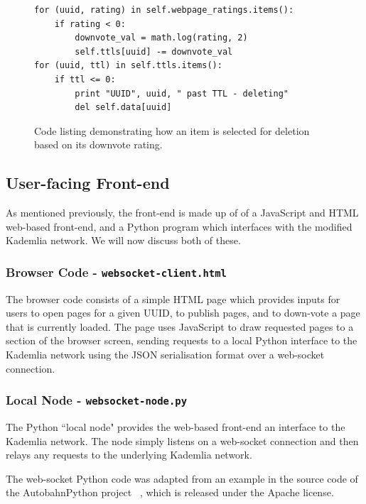\begin{figure}[H]
	\begin{lstlisting}
for (uuid, rating) in self.webpage_ratings.items():
	if rating < 0:
	    downvote_val = math.log(rating, 2)
	    self.ttls[uuid] -= downvote_val
for (uuid, ttl) in self.ttls.items():
    if ttl <= 0:
        print "UUID", uuid, " past TTL - deleting"
        del self.data[uuid]
	\end{lstlisting}
    \caption{Code listing demonstrating how an item is selected for deletion based on its downvote rating.}
    \label{fig:code-downvote}
\end{figure}

\subsection{User-facing Front-end}

As mentioned previously, the front-end is made up of of a JavaScript and HTML web-based front-end, and a Python program which
interfaces with the modified Kademlia network. We will now discuss both of these.

\subsubsection{Browser Code - \texttt{websocket-client.html}}

The browser code consists of a simple HTML page which provides inputs for users to open pages for a given UUID, to publish pages,
and to down-vote a page that is currently loaded. The page uses JavaScript to draw requested pages to a section of the browser screen,
sending requests to a local Python interface to the Kademlia network using the JSON serialisation format over a web-socket connection.

\subsubsection{Local Node - \texttt{websocket-node.py}}

The Python ``local node" provides the web-based front-end an interface to the Kademlia network. The node simply listens on a web-socket connection
and then relays any requests to the underlying Kademlia network.

The web-socket Python code was adapted from an example in the source code of the AutobahnPython project ~\cite{websocket}, which is released
under the Apache license.

